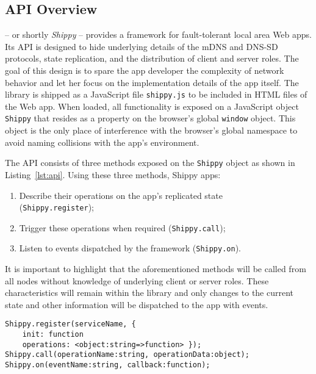 \subsection{API Overview}
\label{sub:approach_api_overview}

\APIName -- or shortly \textit{Shippy} -- provides a framework for fault-tolerant local area Web apps.
Its API is designed to hide underlying details of the mDNS and DNS-SD protocols, state replication, and the distribution of client and server roles.
The goal of this design is to spare the app developer the complexity of network behavior and let her focus on the implementation details of the app itself.
The library is shipped as a JavaScript file \texttt{shippy.js} to be included in HTML files of the Web app.
When loaded, all functionality is exposed on a JavaScript object \texttt{Shippy} that resides as a property on the browser's global \texttt{window} object.
This object is the only place of interference with the browser's global namespace to avoid naming collisions with the app's environment.

The API consists of three methods exposed on the \texttt{Shippy} object as shown in Listing~\ref{lst:api}.
Using these three methods, Shippy apps:

\begin{enumerate}
    \item Describe their operations on the app's replicated state \\ (\texttt{Shippy.register});
    \item Trigger these operations when required (\texttt{Shippy.call});
    \item Listen to events dispatched by the framework (\texttt{Shippy.on}).
\end{enumerate}


It is important to highlight that the aforementioned methods will be called from all nodes without knowledge of underlying client or server roles.
These characteristics will remain within the library and only changes to the current state and other information will be dispatched to the app with events.

\begin{lstlisting}[caption={\APIName API},label={lst:api}]
Shippy.register(serviceName, {
    init: function
    operations: <object:string=>function> });
Shippy.call(operationName:string, operationData:object);
Shippy.on(eventName:string, callback:function);
\end{lstlisting}

